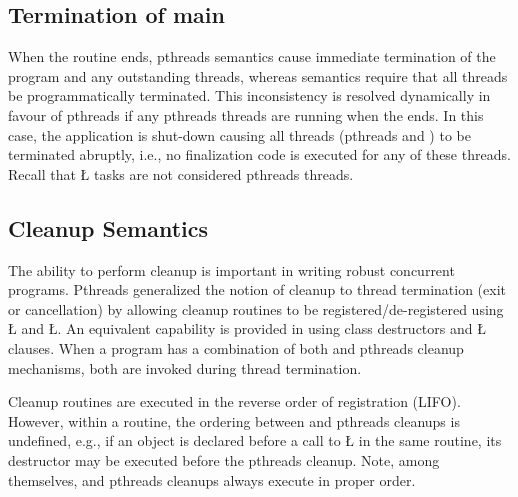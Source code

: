 \documentclass[openright,twoside]{report}
\begin{document}
\subsection{\texorpdfstring{Termination of {\BGfont main}}{Termination of main}}

When the  routine ends, pthreads semantics cause immediate termination of the program and any outstanding threads, whereas \uC semantics require that all threads be programmatically terminated.
This inconsistency is resolved dynamically in favour of pthreads if any pthreads threads are running when the  ends.
In this case, the application is shut-down causing all threads (pthreads and \uC) to be terminated abruptly, i.e., no finalization code is executed for any of these threads.
Recall that \LGinlinetrue\LGbegin\lgrinde\L{}\endlgrinde\LGend{} tasks are not considered pthreads threads. 


\subsection{Cleanup Semantics}

The ability to perform cleanup is important in writing robust concurrent programs.
Pthreads generalized the notion of cleanup to thread termination (exit or cancellation) by allowing cleanup routines to be registered/de-registered using \LGinlinetrue\LGbegin\lgrinde\L{}\endlgrinde\LGend{} and \LGinlinetrue\LGbegin\lgrinde\L{}\endlgrinde\LGend{}.
An equivalent capability is provided in \CC using class destructors and \LGinlinetrue\LGbegin\lgrinde\L{}\endlgrinde\LGend{} clauses.
When a \uC program has a combination of both \CC and pthreads cleanup mechanisms, both are invoked during thread termination.

Cleanup routines are executed in the reverse order of registration (LIFO).
However, within a routine, the ordering between \CC and pthreads cleanups is undefined, e.g., if an object is declared before a call to \LGinlinetrue\LGbegin\lgrinde\L{}\endlgrinde\LGend{} in the same routine, its destructor may be executed before the pthreads cleanup.
Note, among themselves, \CC and pthreads cleanups always execute in proper order.
\end{document}
